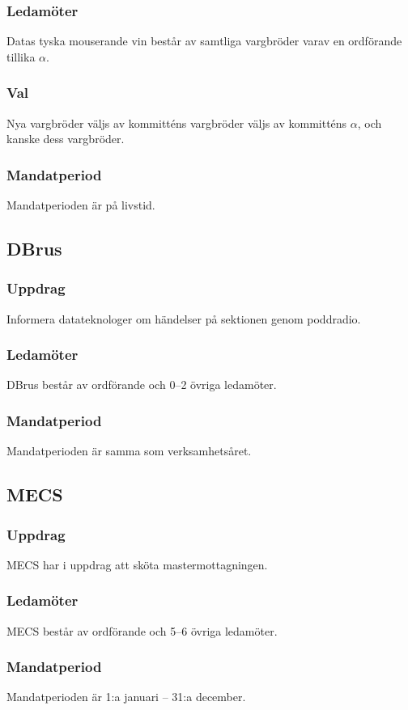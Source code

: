 \subsubsection{Ledamöter}
Datas tyska mouserande vin består av samtliga vargbröder varav en ordförande tillika $\alpha$. 
\subsubsection{Val}
Nya vargbröder väljs av kommitténs vargbröder väljs av kommitténs $\alpha$, och kanske dess vargbröder.
\subsubsection{Mandatperiod}
Mandatperioden är på livstid.

\subsection{DBrus}
\subsubsection{Uppdrag}
Informera datateknologer om händelser på sektionen genom poddradio.
\subsubsection{Ledamöter}
DBrus består av ordförande och 0--2 övriga ledamöter.
\subsubsection{Mandatperiod}
Mandatperioden är samma som verksamhetsåret.

\subsection{MECS}
\subsubsection{Uppdrag}
MECS har i uppdrag att sköta mastermottagningen.
\subsubsection{Ledamöter}
MECS består av ordförande och 5--6 övriga ledamöter.
\subsubsection{Mandatperiod}
Mandatperioden är 1:a januari -- 31:a december.

